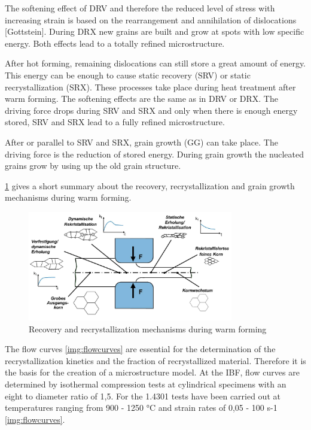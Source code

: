 The softening effect of DRV and therefore the reduced level of stress with increasing strain is based on the rearrangement and annihilation of dislocations [Gottstein]. During DRX new grains are built and grow at spots with low specific energy. Both effects lead to a totally refined microstructure.\par

After hot forming, remaining dislocations can still store a great amount of energy. This energy can be enough to cause static recovery (SRV) or static recrystallization (SRX). These processes take place during heat treatment after warm forming. The softening effects are the same as in DRV or DRX. The driving force drops during SRV and SRX and only when there is enough energy stored, SRV and SRX lead to a fully refined microstructure.\par 

After or parallel to SRV and SRX, grain growth (GG) can take place. The driving force is the reduction of stored energy. During grain growth the nucleated grains grow by using up the old grain structure.\par 

\ref{img:recovandrecrystwarmforming} gives a short summary about the recovery, recrystallization and grain growth mechanisms during warm forming.

\begin{figure}[htbp]
 \centering
 \includegraphics[width=0.8\textwidth]{images/recovandrecrystwarmforming}
 \caption{Recovery and recrystallization mechanisms during warm forming}
 \label{img:recovandrecrystwarmforming}
\end{figure}

The flow curves \ref{img:flowcurves} are essential for the determination of the recrystallization kinetics and the fraction of recrystallized material. Therefore it is the basis for the creation of a microstructure model. At the IBF, flow curves are determined by isothermal compression tests at cylindrical specimens with an eight to diameter ratio of 1,5. For the 1.4301 tests have been carried out at temperatures ranging from 900 - 1250 °C and strain rates of 0,05 - 100 s-1 \ref{img:flowcurves}.

